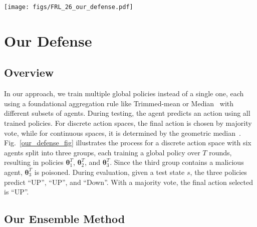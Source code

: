 

\begin{figure*}[!t]
	\centering
	{\texttt{[image: figs/FRL\_26\_our\_defense.pdf]}}
	\vspace{1mm}
	\caption{Illustration of our ensemble framework with discrete action space.}
	\label{our_defense_fig}
\end{figure*}


\section{Our Defense}
\label{section:our_aggregation}



\subsection{Overview}


%


In our approach, we train multiple global policies instead of a single one, each using a foundational aggregation rule like Trimmed-mean or Median~\cite{yin2018byzantine} with different subsets of agents. During testing, the agent predicts an action using all trained policies. For discrete action spaces, the final action is chosen by majority vote, while for continuous spaces, it is determined by the geometric median~\cite{ChenPOMACS17}. 
%
Fig.~\ref{our_defense_fig} illustrates the process for a discrete action space with six agents split into three groups, each training a global policy over $T$ rounds, resulting in policies $\bm{\theta}_1^T$, $\bm{\theta}_2^T$, and $\bm{\theta}_3^T$. Since the third group contains a malicious agent, $\bm{\theta}_3^T$ is poisoned. During evaluation, given a test state $s$, the three policies predict ``UP'', ``UP'', and ``Down''. With a majority vote, the final action selected is ``UP''.






\subsection{Our Ensemble Method}
\label{subsec:Our Ensemble Method}


